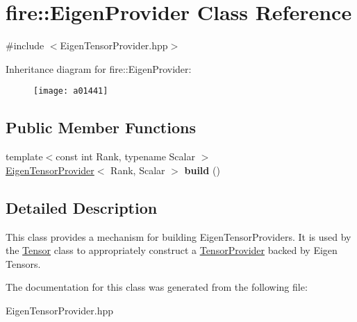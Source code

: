 \hypertarget{a01441}{}\section{fire\+:\+:Eigen\+Provider Class Reference}
\label{a01441}


{\ttfamily \#include $<$Eigen\+Tensor\+Provider.\+hpp$>$}

Inheritance diagram for fire\+:\+:Eigen\+Provider\+:\begin{figure}[H]
\begin{center}
\leavevmode
\texttt{[image: a01441]}
\end{center}
\end{figure}
\subsection*{Public Member Functions}
\begin{DoxyCompactItemize}
\item 
\mbox{\label{a01441_ab9bfc7a0004ea10d57442f495c468b2e}} 
{\footnotesize template$<$const int Rank, typename Scalar $>$ }\\\hyperlink{a01437}{Eigen\+Tensor\+Provider}$<$ Rank, Scalar $>$ {\bfseries build} ()
\end{DoxyCompactItemize}


\subsection{Detailed Description}
This class provides a mechanism for building Eigen\+Tensor\+Providers. It is used by the \hyperlink{a01445}{Tensor} class to appropriately construct a \hyperlink{a01449}{Tensor\+Provider} backed by Eigen Tensors. 

The documentation for this class was generated from the following file\+:\begin{DoxyCompactItemize}
\item 
Eigen\+Tensor\+Provider.\+hpp\end{DoxyCompactItemize}
